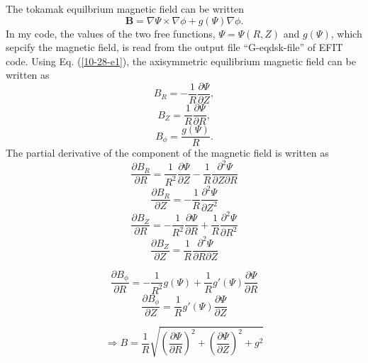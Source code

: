 \documentclass{article}
\begin{document}
The tokamak equilbrium magnetic field can be written
\begin{equation}
  \label{10-28-e1} \mathbf{B}= \nabla \Psi \times \nabla \phi + g (\Psi)
  \nabla \phi .
\end{equation}
In my code, the values of the two free functions, $\Psi = \Psi (R, Z)$ and $g
(\Psi)$, which sepcify the magnetic field, is read from the output file
``G-eqdsk-file'' of EFIT code. Using Eq. (\ref{10-28-e1}), the axisymmetric
equilibrium magnetic field can be written as
\begin{equation}
  B_R = - \frac{1}{R}  \frac{\partial \Psi}{\partial Z},
\end{equation}
\begin{equation}
  B_Z = \frac{1}{R}  \frac{\partial \Psi}{\partial R},
\end{equation}
\begin{equation}
  B_{\phi} = \frac{g (\Psi)}{R} .
\end{equation}
The partial derivative of the component of the magnetic field is written as
\begin{equation}
  \frac{\partial B_R}{\partial R} = \frac{1}{R^2}  \frac{\partial
  \Psi}{\partial Z} - \frac{1}{R} \frac{\partial^2 \Psi}{\partial Z \partial
  R}
\end{equation}
\begin{equation}
  \frac{\partial B_R}{\partial Z} = - \frac{1}{R}  \frac{\partial^2
  \Psi}{\partial Z^2}
\end{equation}
\begin{equation}
  \frac{\partial B_Z}{\partial R} = - \frac{1}{R^2}  \frac{\partial
  \Psi}{\partial R} + \frac{1}{R} \frac{\partial^2 \Psi}{\partial R^2}
\end{equation}
\begin{equation}
  \frac{\partial B_Z}{\partial Z} = \frac{1}{R}  \frac{\partial^2
  \Psi}{\partial R \partial Z}
\end{equation}

\begin{equation}
  \frac{\partial B_{\phi}}{\partial R} = - \frac{1}{R^2} g (\Psi) +
  \frac{1}{R} g' (\Psi) \frac{\partial \Psi}{\partial R}
\end{equation}
\begin{equation}
  \frac{\partial B_{\phi}}{\partial Z} = \frac{1}{R} g' (\Psi) \frac{\partial
  \Psi}{\partial Z}
\end{equation}



\begin{equation}
  \Rightarrow B = \frac{1}{R} \sqrt{\left(  \frac{\partial \Psi}{\partial R}
  \right)^2 + \left(  \frac{\partial \Psi}{\partial Z} \right)^2 + g^2}
\end{equation}
\end{document}
